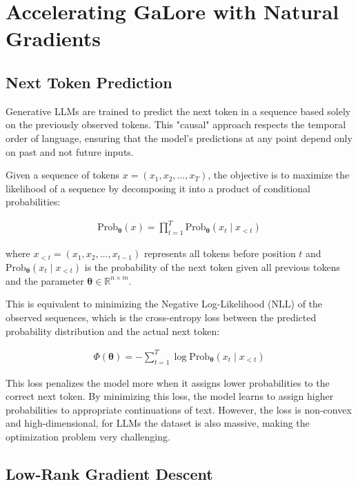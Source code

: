 \section{Accelerating GaLore with Natural Gradients}

\subsection{Next Token Prediction}

Generative LLMs are trained to predict the next token in a sequence based solely on the previously observed tokens. This "causal" approach respects the temporal order of language, ensuring that the model's predictions at any point depend only on past and not future inputs.

Given a sequence of tokens \( x = (x_1, x_2, \dots, x_T) \), the objective is to maximize the likelihood of a sequence by decomposing it into a product of conditional probabilities:

\begin{eqnarray}
\text{Prob}_{\mathbf{\theta}}(x) = \prod_{t=1}^T \text{Prob}_{\mathbf{\theta}}(x_t \mid x_{<t})
\end{eqnarray}

where \( x_{<t} = (x_1, x_2, \dots, x_{t-1}) \) represents all tokens before position \( t \) and \( \text{Prob}_{\mathbf{\theta}}(x_t \mid x_{<t}) \) is the probability of the next token given all previous tokens and the parameter \( \mathbf{\theta} \in \mathbb{R}^{n \times m} \).

This is equivalent to minimizing the Negative Log-Likelihood (NLL) of the observed sequences, which is the cross-entropy loss between the predicted probability distribution and the actual next token:

\begin{eqnarray}
\Phi(\mathbf{\theta}) = -\sum_{t=1}^T \log \text{Prob}_{\mathbf{\theta}}(x_t \mid x_{<t})
\label{eq:cross_entropy_loss}
\end{eqnarray}

This loss penalizes the model more when it assigns lower probabilities to the correct next token. By minimizing this loss, the model learns to assign higher probabilities to appropriate continuations of text. However, the loss is non-convex and high-dimensional, for LLMs the dataset is also massive, making the optimization problem very challenging.

\subsection{Low-Rank Gradient Descent}

